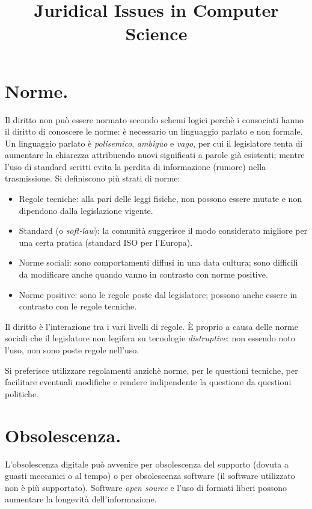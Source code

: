 \documentclass[a4page, 11pt, twocolumn]{article}
\title{Juridical Issues in Computer Science}
\date{}
\begin{document}
\maketitle

\section{Norme.}
Il diritto non può essere normato secondo schemi logici perchè i consociati hanno il diritto di conoscere le norme: è necessario un linguaggio parlato e non formale.
Un linguaggio parlato è \textit{polisemico}, \textit{ambiguo} e \textit{vago}, per cui il legislatore tenta di aumentare la chiarezza attribuendo nuovi significati a parole già esistenti; mentre l'uso di standard scritti evita la perdita di informazione (rumore) nella trasmissione. \newline
Si definiscono più strati di norme:
\begin{itemize}
\item Regole tecniche: alla pari delle leggi fisiche, non possono essere mutate e non dipendono dalla legislazione vigente.
\item Standard (o \textit{soft-law}): la comunità suggerisce il modo considerato migliore per una certa pratica (standard ISO per l'Europa).
\item Norme sociali: sono comportamenti diffusi in una data cultura; sono difficili da modificare anche quando vanno in contrasto con norme positive.
\item Norme positive: sono le regole poste dal legislatore; possono anche essere in contrasto con le regole tecniche.
\end{itemize}
Il diritto è l'interazione tra i vari livelli di regole. \newline
È proprio a causa delle norme sociali che il legislatore non legifera su tecnologie \textit{distruptive}: non essendo noto l'uso, non sono poste regole nell'uso.

Si preferisce utilizzare regolamenti anzichè norme, per le questioni tecniche, per facilitare eventuali modifiche e rendere indipendente la questione da questioni politiche.

\section{Obsolescenza.}
L'obsolescenza digitale può avvenire per obsolescenza del supporto (dovuta a guasti meccanici o al tempo) o per obsolescenza software (il software utilizzato non è più supportato).
Software \textit{open source} e l'uso di formati liberi possono aumentare la longevità dell'informazione.
\end{document}
